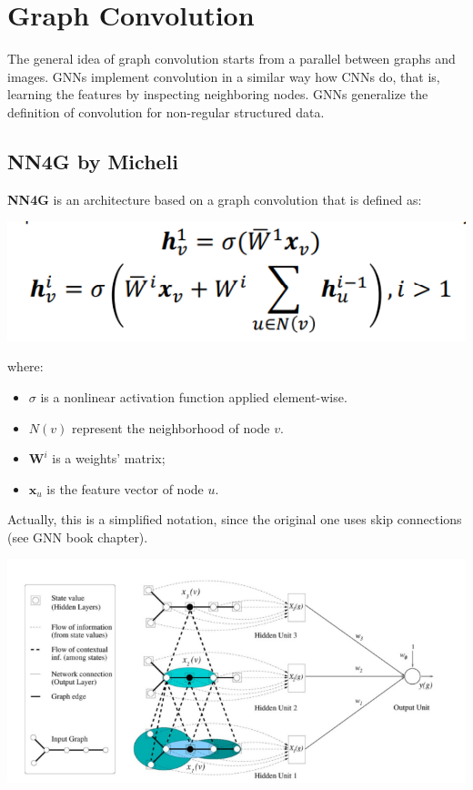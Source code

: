 \section{Graph Convolution}
The general idea of graph convolution starts from a parallel between graphs and images. GNNs implement convolution in a similar way how CNNs do, that is, learning the features by inspecting neighboring nodes. GNNs generalize the definition of convolution for non-regular structured data.

\subsection{NN4G by Micheli}
\textbf{NN4G} is an architecture based on a graph convolution that is defined as:
\begin{center}
    \includegraphics[scale=0.6]{images/nn4g.png}
\end{center}
where: 
\begin{itemize}
    \item $\sigma$ is a nonlinear activation function applied element-wise.
    \item $N(v)$ represent the neighborhood of node $v$.
    \item $\textbf{W}^i$ is a weights' matrix;
    \item $\textbf{x}_u$ is the feature vector of node $u$.
\end{itemize}
Actually, this is a simplified notation, since the original one uses skip connections (see GNN book chapter).
\begin{center}
    \includegraphics[]{images/nn4g-2.png}
\end{center}
